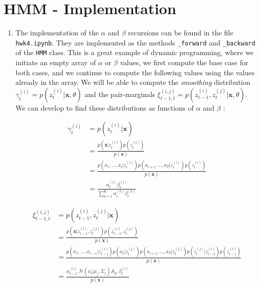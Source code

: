\documentclass[11pt]{article}
\begin{document}
\section{HMM - Implementation}\label{sec:num2}

\begin{enumerate}

\item The implementation of the $\alpha$ and $\beta$ recursions can be found in the file \texttt{hwk4.ipynb}. They are implemented as the methods \texttt{\_forward} and \texttt{\_backward} of the \texttt{HMM} class. This is a great example of dynamic programming, where we initiate an empty array of $\alpha$ or $\beta$ values, we first compute the base case for both cases, and we continue to compute the following values using the values already in the array. We will be able to compute the \textit{smoothing} distribution $\gamma_{t} ^{(i)} = p\left(z_{t} ^{(i)}|\mathbf{x},\theta\right)$ and the pair-marginals $\xi_{t-1,t} ^{(i,j)} = p\left(z_{t-1} ^{(i)}, z_{t} ^{(j)}|\mathbf{x}, \theta \right)$. We can develop to find these distributions as functions of $\alpha$ and $\beta$ :

\begin{align*}
\gamma_t ^{(i)} & = p\!\left(z_{t} ^{(i)}|\mathbf{x}\right)\\
				& = \frac{p\!\left(\mathbf{x}|z_{t} ^{(i)}\right) p\!\left(z_{t} ^{(i)}\right)}{p(\mathbf{x})} \\
				& = \frac{p\!\left(x_{1},\dots,x_{t}|z_{t} ^{(i)}\right) p\!\left( x_{t+1},\dots,x_{T} |z_{t} ^{(i)} \right) p\!\left(z_{t} ^{(i)}\right)}{p(\mathbf{x})}\\
				& = \frac{\alpha_t ^{(i)} \beta_t ^{(i)}}{\sum_{k=1}^{K} \alpha_t ^{(k)} \beta_t ^{(k)}}
\end{align*}

\begin{align*}
\xi_{t-1, t} ^{(i,j)} & = p\!\left(z_{t-1} ^{(i)}, z_{t} ^{(j)}|\mathbf{x}\right) \\
					  & = \frac{p\!\left(\mathbf{x}|z_{t-1}^{(i)},z_{t} ^{(j)}\right) p\!\left(z_{t-1}^{(i)},z_{t}^{(j)}\right)}{p(\mathbf{x})} \\
					  & = \frac{p\!\left(x_1,\dots, x_{t-1}|z_{t-1}^{(i)}\right) p\!\left(x_{t}|z_{t}^{(j)}\right) p\!\left( x_{t+1},\dots,x_{T}|z_{t}^{(j)} \right) p\!\left(z_{t}^{(j)}|z_{t-1}^{(i)}\right) p\!\left(z_{t-1}^{(i)}\right)}{p(\mathbf{x})} \\
					  & = \frac{\alpha_{t-1}^{(i)} \; \mathcal{N}\!\!\left( x_t | \mu_j, \Sigma_j  \right) A_{ji} \;\beta_{t}^{(i)}}{p(\mathbf{x})}
\end{align*}


\end{enumerate}
\end{document}
